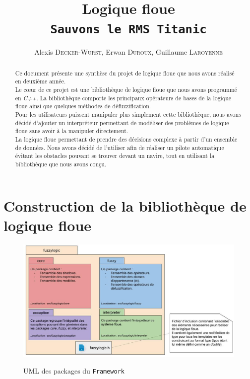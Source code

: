 \documentclass[a4paper,11pt]{article}
\title{Logique floue\\\texttt{Sauvons le RMS Titanic}}
\author{Alexis \textsc{Decker-Wurst}, Erwan  \textsc{Duroux}, Guillaume  \textsc{Laroyenne}}
\begin{document}
    \maketitle

    \begin{abstract}
        Ce document présente une synthèse du projet de logique floue que nous avons réalisé en deuxième année.\\
        Le cœur de ce projet est une bibliothèque de logique floue que nous avons programmé en \textit{C++}. La bibliothèque comporte les principaux opérateurs de bases de la logique floue ainsi que quelques méthodes de défuzzification.\\
        Pour les utilisateurs puissent manipuler plus simplement cette bibliothèque, nous avons décidé d'ajouter un interpréteur permettant de modéliser des problèmes de logique floue sans avoir à la manipuler directement.\\
        La logique floue permettant de prendre des décisions complexe à partir d'un ensemble de données. Nous avons décidé de l'utiliser afin de réaliser un pilote automatique évitant les obstacles pouvant se trouver devant un navire, tout en utilisant la bibliothèque que nous avons conçu.
    \end{abstract}

    \section{Construction de la bibliothèque de logique floue}

    \begin{figure}[h!]
        \begin{center}
            \caption{UML des packages du \texttt{Framework}}
            \includegraphics[scale=0.5]{assets/Packages_(UML).jpg}
            \label{fig:umlPackage}
        \end{center}
    \end{figure}
\end{document}
